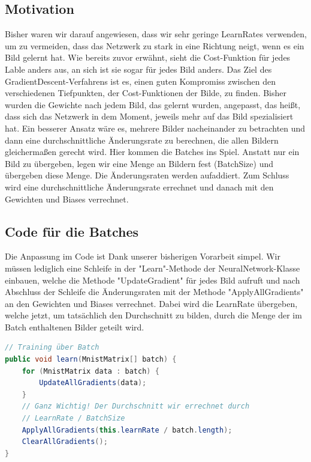 \documentclass[12pt]{article}
\begin{document}
\subsection{Motivation}
Bisher waren wir darauf angewiesen, dass wir sehr geringe LearnRates verwenden, um zu vermeiden, dass das Netzwerk zu stark in eine Richtung neigt, wenn es ein Bild gelernt hat. Wie bereits zuvor erwähnt, sieht die Cost-Funktion für jedes Lable anders aus, an sich ist sie sogar für jedes Bild anders. Das Ziel des GradientDescent-Verfahrens ist es, einen guten Kompromiss zwischen den verschiedenen Tiefpunkten, der Cost-Funktionen der Bilde, zu finden.
Bisher wurden die Gewichte nach jedem Bild, das gelernt wurden, angepasst, das heißt, dass sich das Netzwerk in dem Moment, jeweils mehr auf das Bild spezialisiert hat. Ein besserer Ansatz wäre es, mehrere Bilder nacheinander zu betrachten und dann eine durchschnittliche Änderungsrate zu berechnen, die allen Bildern gleichermaßen gerecht wird. Hier kommen die Batches ins Spiel.
Anstatt nur ein Bild zu übergeben, legen wir eine Menge an Bildern fest (BatchSize) und übergeben diese Menge. Die Änderungsraten werden aufaddiert. Zum Schluss wird eine durchschnittliche Änderungsrate errechnet und danach mit den Gewichten und Biases verrechnet.
\subsection{Code für die Batches}
Die Anpassung im Code ist Dank unserer bisherigen Vorarbeit simpel.
Wir müssen lediglich eine Schleife in der "Learn"-Methode der NeuralNetwork-Klasse einbauen, welche die Methode "UpdateGradient" für jedes Bild aufruft und nach Abschluss der Schleife die Änderungsraten mit der Methode "ApplyAllGradients" an den Gewichten und Biases verrechnet. Dabei wird die LearnRate übergeben, welche jetzt, um tatsächlich den Durchschnitt zu bilden, durch die Menge der im Batch enthaltenen Bilder geteilt wird.
\begin{lstlisting}[language=Java]
// Training über Batch
public void learn(MnistMatrix[] batch) {
    for (MnistMatrix data : batch) {
        UpdateAllGradients(data);
    }
    // Ganz Wichtig! Der Durchschnitt wir errechnet durch
    // LearnRate / BatchSize
    ApplyAllGradients(this.learnRate / batch.length);
    ClearAllGradients();
}
\end{lstlisting}
\end{document}
